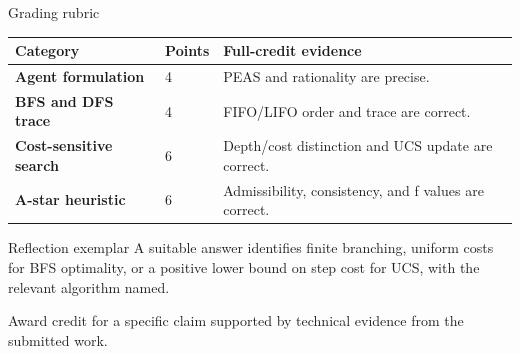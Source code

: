 \documentclass[aspectratio=169,11pt]{beamer}
\begin{document}
\begin{frame}{Grading rubric}
\scriptsize
\begin{tabularx}{\textwidth}{>{\bfseries}p{} p{} X}
\toprule
Category & Points & Full-credit evidence \\
\midrule
Agent formulation & 4 & PEAS and rationality are precise. \\
BFS and DFS trace & 4 & FIFO/LIFO order and trace are correct. \\
Cost-sensitive search & 6 & Depth/cost distinction and UCS update are correct. \\
A-star heuristic & 6 & Admissibility, consistency, and f values are correct. \\
\bottomrule
\end{tabularx}
\end{frame}

\begin{frame}{Reflection exemplar}
\small
\answerlabel A suitable answer identifies finite branching, uniform costs for BFS optimality, or a positive lower bound on step cost for UCS, with the relevant algorithm named.

\vspace{0.25cm}
\gradinglabel Award credit for a specific claim supported by technical evidence from the submitted work.
\end{frame}
\end{document}
